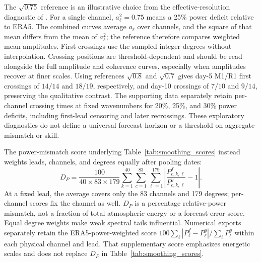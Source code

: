 \documentclass{article}
\newcommand{\vfourchange}[1]{{\color{blue}#1}}
\newcommand{\vfourred}[1]{{\color{red}#1}}
\newif\ifvfivechanges
\newcommand{\vfiveidentity}[1]{#1}
\DeclareRobustCommand{\vfiveadded}[1]{\ifvfivechanges{\color{vfiveAdded}%
  \let\vfourchange\vfiveidentity\let\vfourred\vfiveidentity#1}\else{\color{blue}%
  \let\vfourchange\vfiveidentity\let\vfourred\vfiveidentity#1}\fi}
\begin{document}
\vfiveadded{The $\sqrt{0.75}$ reference is an illustrative choice from the effective-resolution diagnostic of \citet[Section~3.1]{subich2025spectral}. For a single channel, $a_\ell^2=0.75$ means a 25\% power deficit relative to ERA5. The combined curves average $a_\ell$ over channels, and the square of that mean differs from the mean of $a_\ell^2$; the reference therefore compares weighted mean amplitudes. First crossings use the sampled integer degrees without interpolation. Crossing positions are threshold-dependent and should be read alongside the full amplitude and coherence curves, especially when amplitudes recover at finer scales. Using references $\sqrt{0.8}$ and $\sqrt{0.7}$ gives day-5 M1/\vfourchange{R1} first crossings of $14/14$ and $18/19$, respectively, and day-10 crossings of $7/10$ and $9/14$, preserving the qualitative contrast. The supporting data separately retain per-channel crossing times at fixed wavenumbers for 20\%, 25\%, and 30\% power deficits, including first-lead censoring and later recrossings. These exploratory diagnostics do not define a universal forecast horizon or a threshold on aggregate mismatch or skill.}


\vfourred{The power-mismatch score underlying Table~\ref{tab:smoothing_scores} instead weights leads, channels, and degrees equally after pooling dates:}
\vfourred{\begin{equation}
D_P=\frac{100}{40\times83\times179}
       \sum_{k=1}^{40}\sum_{c=1}^{83}\sum_{\ell=1}^{179}
       \left|\frac{P^f_{c,k,\ell}}{P^y_{c,k,\ell}}-1\right|.
\label{eq:relative_power_mismatch}
\end{equation}}
\vfiveadded{At a fixed lead, the average covers only the 83 channels and 179 degrees; per-channel scores fix the channel as well. $D_P$ is a percentage relative-power mismatch, not a fraction of total atmospheric energy or a forecast-error score. Equal degree weights make weak spectral tails influential. Numerical exports separately retain the ERA5-power-weighted score $100\sum_\ell|P^f_\ell-P^y_\ell|/\sum_\ell P^y_\ell$ within each physical channel and lead. That supplementary score emphasizes energetic scales and does not replace $D_P$ in Table~\ref{tab:smoothing_scores}.}
\end{document}
